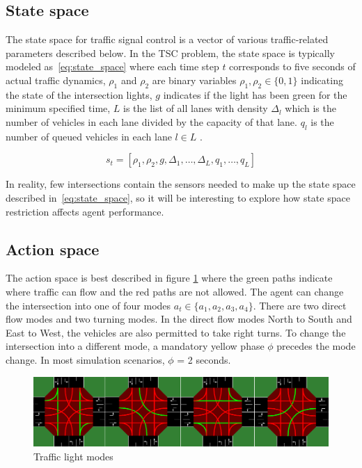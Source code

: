 \documentclass[letterpaper]{article} %
\begin{document}
\subsection{State space}
The state space for traffic signal control is a vector of various traffic-related parameters described below.
In the TSC problem, the state space is typically modeled as~\ref{eq:state_space} where each time step \(t\) corresponds to five seconds of actual traffic dynamics, \(\rho_1\) and \(\rho_2\) are binary variables \(\rho_1, \rho_2 \in \{0, 1\}\) indicating the state of the intersection lights, \(g\) indicates if the light has been green for the minimum specified time, \(L\) is the list of all lanes with density \(\Delta_l\) which is the number of vehicles in each lane divided by the capacity of that lane.
\(q_l\) is the number of queued vehicles in each lane \(l \in L\) \cite{Almeida2022MultiagentRL}.

\begin{equation}
s_t = [\rho_1, \rho_2, g, \Delta_1, \ldots, \Delta_L, q_1, \ldots, q_L]
\label{eq:state_space}
\end{equation}

In reality, few intersections contain the sensors needed to make up the state space described in~\ref{eq:state_space}, so it will be interesting to explore how state space restriction affects agent performance.

\subsection{Action space}
The action space is best described in figure \ref{fig:action_space} where the green paths indicate where traffic can flow and the red paths are not allowed.
The agent can change the intersection into one of four modes \(a_t \in \{a_1, a_2, a_3, a_4\}\).
There are two direct flow modes and two turning modes.
In the direct flow modes North to South and East to West, the vehicles are also permitted to take right turns.
To change the intersection into a different mode, a mandatory yellow phase $\phi$ precedes the mode change.
In most simulation scenarios, $\phi$ = 2 seconds.

\begin{figure}[htbp]
  \centering
  \includegraphics[width=0.8\linewidth]{actions.png}
  \caption{Traffic light modes \cite{sumorl}}
  \label{fig:action_space}
\end{figure}
\end{document}
